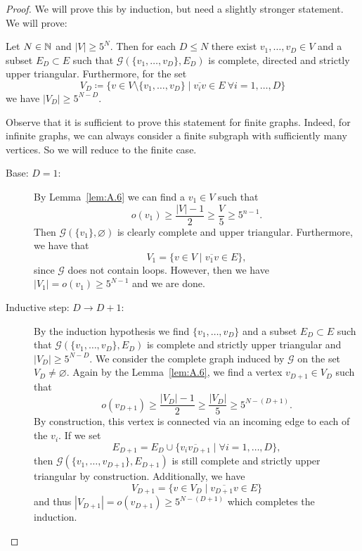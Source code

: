 \begin{proof}
  We will prove this by induction, but need a slightly stronger statement. We will prove:

  Let \(N \in \mathbb{N}\) and \(|V| \geq 5^N\). Then for each \(D \leq N\) there exist \(v_1,\dots, v_D \in V\) and a subset \(E_D \subset E\) such that \(\mathcal{G}(\{v_1, \dots, v_D\}, E_D)\) is complete, directed and strictly upper triangular. Furthermore, for the set
  \[
    V_D \coloneqq \{v \in V \setminus \{v_1, \dots, v_D\} \mid \overline{v_iv} \in E\ \forall i =1,\dots, D\}
  \]
  we have \(|V_D| \geq 5^{N-D}\).

  Observe that it is sufficient to prove this statement for finite graphs. Indeed, for infinite graphs, we can always consider a finite subgraph with sufficiently many vertices. So we will reduce to the finite case.
  \begin{description}
  \item[Base: \(D = 1\):] By Lemma~\ref{lem:A.6} we can find a \(v_1 \in V\) such that
    \[
      o(v_1) \geq \frac{|V| - 1}{2} \geq \frac{V}{5} \geq 5^{n-1}.
    \]
    Then \(\mathcal{G}(\{v_1\}, \varnothing)\) is clearly complete and upper triangular. Furthermore, we have that
    \[
      V_1 = \{v \in V \mid \overline{v_1v} \in E\},
    \]
    since \(\mathcal{G}\) does not contain loops. However, then we have \(|V_1| = o(v_1) \geq 5^{N-1}\) and we are done.
  \item[Inductive step: \(D \to D+1\):] By the induction hypothesis we find \(\{v_1, \dots, v_D\}\) and a subset \(E_D \subset E\) such that \(\mathcal{G}(\{v_1, \dots, v_D\}, E_D)\) is complete and strictly upper triangular and \(|V_D| \geq 5^{N-D}\). We consider the complete graph induced by \(\mathcal{G}\) on the set \(V_D \neq \varnothing\). Again by the Lemma~\ref{lem:A.6}, we find a vertex \(v_{D+1} \in V_D\) such that
    \[
      o(v_{D+1}) \geq \frac{|V_D| -1}{2} \geq \frac{|V_D|}{5} \geq 5^{N - (D+1)}.
    \]
    By construction, this vertex is connected via an incoming edge to each of the \(v_i\). If we set
    \[
      E_{D+1} = E_D \cup \{\overline{v_iv_{D+1}} \mid \forall i = 1, \dots, D\},
    \]
    then \(\mathcal{G}(\{v_1, \dots, v_{D+1}\}, E_{D+1})\) is still complete and strictly upper triangular by construction. Additionally, we have
    \[
      V_{D+1} = \{v \in V_D \mid \overline{v_{D+1}v} \in E\}
    \]
    and thus \(|V_{D+1}| = o(v_{D+1}) \geq 5^{N- (D+1)}\) which completes the induction.
  \end{description}
\end{proof}

